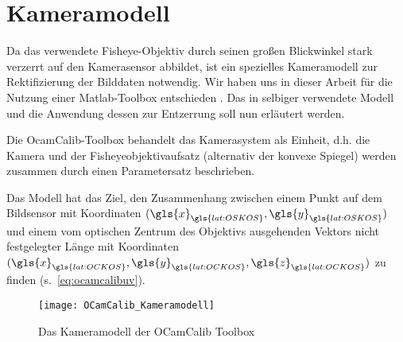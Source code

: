 \section{Kameramodell} \label{sec:kameramodell}
Da das verwendete Fisheye-Objektiv durch seinen großen Blickwinkel stark verzerrt auf den Kamerasensor abbildet, ist ein spezielles Kameramodell zur Rektifizierung der Bilddaten notwendig. Wir haben uns in dieser Arbeit für die Nutzung einer Matlab-Toolbox entschieden  \autocite{OCamCalibOmnidirectionalCamera, scaramuzzaFlexibleTechniqueAccurate2006, scaramuzzaToolboxEasilyCalibrating2006, scaramuzzaOmnidirectionalVisionCalibration2007, rufliAutomaticDetectionCheckerboards2008}. Das in selbiger verwendete Modell und die Anwendung dessen zur Entzerrung soll nun erläutert werden. 

Die OcamCalib-Toolbox behandelt das Kamerasystem als Einheit, d.h. die Kamera und der Fisheyeobjektivaufsatz (alternativ der konvexe Spiegel) werden zusammen durch einen Parametersatz beschrieben.

Das Modell hat das Ziel, den Zusammenhang zwischen einem Punkt auf dem Bildsensor  mit Koordinaten \((\gls{x}_{\gls{lat:OSKOS}}, \gls{y}_{\gls{lat:OSKOS}})\) und einem vom optischen Zentrum des Objektivs ausgehenden Vektors nicht festgelegter Länge  mit Koordinaten \((\gls{x}_{\gls{lat:OCKOS}}, \gls{y}_{\gls{lat:OCKOS}}, \gls{z}_{\gls{lat:OCKOS}})\) zu finden (s.~\eqref{eq:ocamcalibuv}).

\begin{figure}[H]
  \centering
  \texttt{[image: OCamCalib\_Kameramodell]}
  \caption{Das Kameramodell der OCamCalib Toolbox}
  \label{fig:kameramodell}
\end{figure}

